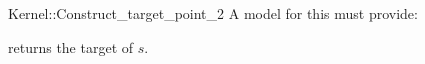 \begin{ccRefFunctionObjectConcept}{Kernel::Construct_target_point_2}
A model for this must provide:


{returns the target of $s$.}

\end{ccRefFunctionObjectConcept}
